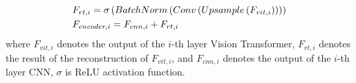 \documentclass{article}
\begin{document}
\begin{eqnarray}
\setlength{\abovedisplayskip}{0pt}
\setlength{\belowdisplayskip}{0pt}
& F_{rt,i}= \sigma\left ( BatchNorm\left ( Conv\left ( Upsample\left ( F_{vit,i}\right )\right ) \right)\right )\label{3.2-1}\\
& F_{encoder,i}= F_{cnn,i}+F_{rt,i}\label{3.2-2}
\setlength{\belowdisplayskip}{3pt}
\end{eqnarray}
where $F_{vit,i}$ denotes the output of the $i$-th layer Vision Transformer, $F_{rt,i}$ denotes the result of the reconstruction of $F_{vit,i}$, and $F_{cnn,i}$ denotes the output of the $i$-th layer CNN, $\sigma$ is ReLU activation function.
 
\end{document}
